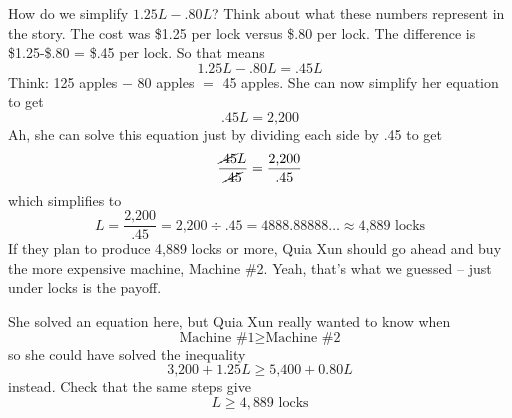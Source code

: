 \noindent How do we simplify $1.25L-.80L$?  Think about what these numbers represent in the story.  The cost was \$1.25 per lock versus \$.80 per lock.   The difference is \$1.25-\$.80 = \$.45 per lock.  So that means
$$1.25L -.80L = .45L$$ Think:  125 apples $-$ 80 apples $=$ 45 apples.  %
She can now simplify her equation to get
$$.45L = \text{2,200}$$
Ah, she can solve this equation just by dividing each side by .45 to get
$$\frac{\cancel{.45}L}{\cancel{.45}}= \frac{\text{2,200}}{.45}$$
which simplifies to $$L = \frac{\text{2,200}}{.45}= \text{2,200} \div .45 = 4888.88888\ldots \approx \text{4,889} \text{ locks}$$
If they plan to produce 4,889 locks or more, Quia Xun should go ahead and buy the more expensive machine, Machine \#2. Yeah, that's what we guessed -- just under  locks is the payoff.

She solved an equation here, but Quia Xun really wanted to know when $$\text{Machine \#1} \ge \text{Machine \#2}$$
so she could have solved the inequality $$\text{3,200} + 1.25L \ge \text{5,400} + 0.80L$$
instead.  
Check that the same steps give 
$$L \ge 4,889 \text{ locks}$$

 